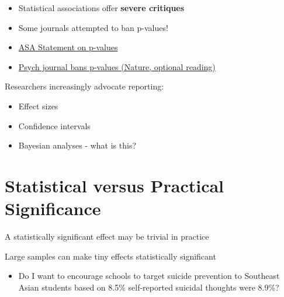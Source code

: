 \documentclass[
  letterpaper,
  DIV=11,
  numbers=noendperiod]{scrreprt}
\providecommand{\tightlist}{%
  \setlength{\itemsep}{0pt}\setlength{\parskip}{0pt}}
\begin{document}
\begin{tcolorbox}[enhanced jigsaw, arc=.35mm, bottomrule=.15mm, bottomtitle=1mm, breakable, colback=white, colbacktitle=quarto-callout-note-color!10!white, colframe=quarto-callout-note-color-frame, coltitle=black, left=2mm, leftrule=.75mm, opacityback=0, opacitybacktitle=0.6, rightrule=.15mm, title=\textcolor{quarto-callout-note-color}{\faInfo}\hspace{0.5em}{Ban on p-values?}, titlerule=0mm, toprule=.15mm, toptitle=1mm]

\begin{itemize}
\tightlist
\item
  Statistical associations offer \textbf{severe critiques}
\item
  Some journals attempted to ban p-values!
\item
  \href{https://www.amstat.org/asa/files/pdfs/P-ValueStatement.pdf}{ASA
  Statement on p-values}
\item
  \href{http://www.stat.yale.edu/~jtc5/238/readings/Psychology-journal-bans-P-values_Nature.pdf}{Psych
  journal bans p-values (Nature, optional reading)}
\end{itemize}

\end{tcolorbox}

Researchers increasingly advocate reporting:

\begin{itemize}
\tightlist
\item
  Effect sizes
\item
  Confidence intervals
\item
  Bayesian analyses - what is this?
\end{itemize}


\chapter{Statistical versus Practical
Significance}\label{statistical-versus-practical-significance}

A statistically significant effect may be trivial in practice

Large samples can make tiny effects statistically significant

\begin{itemize}
\tightlist
\item
  Do I want to encourage schools to target suicide prevention to
  Southeast Asian students based on 8.5\% self-reported suicidal
  thoughts were 8.9\%?
\end{itemize}
\end{document}
